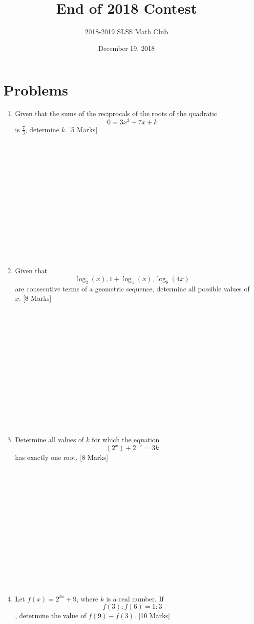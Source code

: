 \documentclass[12pt]{article}
\title{End of 2018 Contest\vspace{-3mm}}
\author{2018-2019 SLSS Math Club\vspace{-5mm}}
\date{December 19, 2018\vspace{-5mm}}
\begin{document}
\maketitle

\newcommand{\aSpace}{\\ \\ \\ \\ \\ \\ \\ \\ \\ \\ \\ \\ \\ \\}

\section*{Problems}

\begin{enumerate}
    \item Given that the sums of the reciprocals of the roots of the quadratic $$ 0 = 3x^2 + 7x + k$$ is $\displaystyle{\frac{7}{3}}$, determine $k$. [5 Marks]\aSpace
    
    \item Given that $$\log_2(x), 1 + \log_4(x), \log_8(4x)$$ are consecutive terms of a geometric sequence, determine all possible values of $x$. [8 Marks] \aSpace
    
    \item Determine all values of $k$ for which the equation $$(2^x) + 2^{-x} = 3k$$ has exactly one root. [8 Marks]\aSpace
    
    \item Let $f(x) = 2^{kx} + 9$, where $k$ is a real number. If $$f(3):f(6) = 1:3$$, determine the value of $f(9) - f(3)$. [10 Marks]
\end{enumerate}
\end{document}
